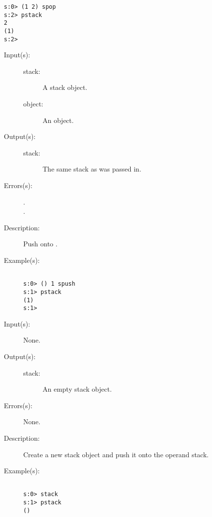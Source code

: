 \begin{description}
\begin{description}
\begin{verbatim}
s:0> (1 2) spop
s:2> pstack
2
(1)
s:2>
		\end{verbatim}
	\end{description}
\label{systemdict:spush}
\item[{\onyxop{stack object}{spush}{stack}}: ]
	\begin{description}\item[]
	\item[Input(s): ]
		\begin{description}\item[]
		\item[stack: ]
			A stack object.
		\item[object: ]
			An object.
		\end{description}
	\item[Output(s): ]
		\begin{description}\item[]
		\item[stack: ]
			The same stack as was passed in.
		\end{description}
	\item[Errors(s): ]
		\begin{description}\item[]
		\item[.]
		\item[.]
		\end{description}
	\item[Description: ]
		Push  onto .
	\item[Example(s): ]\begin{verbatim}

s:0> () 1 spush
s:1> pstack
(1)
s:1>
		\end{verbatim}
	\end{description}
\label{systemdict:stack}
\item[{\onyxop{--}{stack}{stack}}: ]
	\begin{description}\item[]
	\item[Input(s): ] None.
	\item[Output(s): ]
		\begin{description}\item[]
		\item[stack: ]
			An empty stack object.
		\end{description}
	\item[Errors(s): ] None.
	\item[Description: ]
		Create a new stack object and push it onto the operand stack.
	\item[Example(s): ]\begin{verbatim}

s:0> stack
s:1> pstack
()
		\end{verbatim}
	\end{description}
\end{description}

